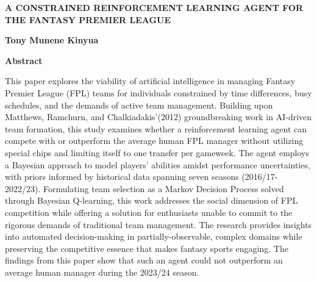 \thispagestyle{plain}
\begin{center}
    \Large
    \textbf{A CONSTRAINED REINFORCEMENT LEARNING AGENT FOR THE FANTASY PREMIER LEAGUE}
    
    \vspace{0.4cm}
    \large
    
    \vspace{0.4cm}
    \textbf{Tony Munene Kinyua}
    
    \vspace{0.9cm}
    \textbf{Abstract}
\end{center}

This paper explores the viability of artificial intelligence in managing Fantasy Premier League (FPL) teams for individuals constrained by time differences, busy schedules, and the demands of active team management. Building upon Matthews, Ramchurn, and Chalkiadakis'(2012) groundbreaking work in AI-driven team formation, this study examines whether a reinforcement learning agent can compete with or outperform the average human FPL manager without utilizing special chips and limiting itself to one transfer per gameweek. The agent employs a Bayesian approach to model players' abilities amidst performance uncertainties, with priors informed by historical data spanning seven seasons (2016/17-2022/23). Formulating team selection as a Markov Decision Process solved through Bayesian Q-learning, this work addresses the social dimension of FPL competition while offering a solution for enthusiasts unable to commit to the rigorous demands of traditional team management. The research provides insights into automated decision-making in partially-observable, complex domains while preserving the competitive essence that makes fantasy sports engaging. The findings from this paper show that such an agent could not outperform an average human manager during the 2023/24 season.